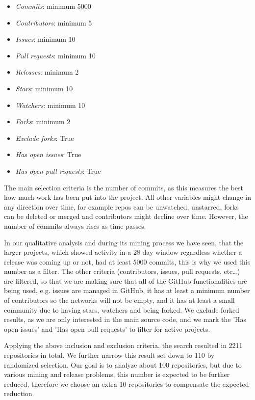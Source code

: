 \begin{itemize}
    \item \textit{Commits}: minimum 5000
    \item \textit{Contributors}: minimum 5
    \item \textit{Issues}: minimum 10
    \item \textit{Pull requests}: minimum 10
    \item \textit{Releases}: minimum 2
    \item \textit{Stars}: minimum 10
    \item \textit{Watchers}: minimum 10
    \item \textit{Forks}: minimum 2
    \item \textit{Exclude forks}: True
    \item \textit{Has open issues}: True
    \item \textit{Has open pull requests}: True
\end{itemize}

The main selection criteria is the number of commits, as this measures the best how much work has been put into the project. All other variables might change in any direction over time, for example repos can be unwatched, unstarred, forks can be deleted or merged and contributors might decline over time. However, the number of commits always rises as time passes.

In our qualitative analysis and during its mining process we have seen, that the larger projects, which showed activity in a 28-day window regardless whether a release was coming up or not, had at least 5000 commits, this is why we used this number as a filter. The other criteria (contributors, issues, pull requests, etc\dots) are filtered, so that we are making sure that all of the GitHub functionalities are being used, e.g. issues are managed in GitHub, it has at least a minimum number of contributors so the networks will not be empty, and it has at least a small community due to having stars, watchers and being forked. We exclude forked results, as we are only interested in the main source code, and we mark the 'Has open issues' and 'Has open pull requests' to filter for active projects.

Applying the above inclusion and exclusion criteria, the search resulted in 2211 repositories in total. We further narrow this result set down to 110 by randomized selection. Our goal is to analyze about 100 repositories, but due to various mining and release problems, this number is expected to be further reduced, therefore we choose an extra 10 repositories to compensate the expected reduction.

